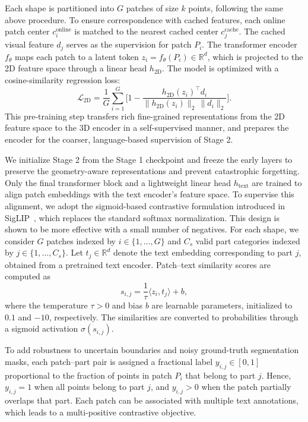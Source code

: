 Each shape is partitioned into \(G\) patches of size \(k\) points, following the same above procedure.
To ensure correspondence with cached features, each online patch center $c_i^{\text{online}}$ is matched
to the nearest cached center $c_j^{\text{cache}}$.
The cached visual feature $d_{j}$ serves as the supervision for patch $P_i$.
The transformer encoder $f_\theta$ maps each patch to a latent token
$z_i = f_\theta(P_i) \in \mathbb{R}^d$,
which is projected to the 2D feature space through a linear head $h_{\text{2D}}$.
The model is optimized with a cosine-similarity regression loss:
\begin{equation}
\mathcal{L}_{\text{2D}} =
\frac{1}{G} \sum_{i=1}^{G}
\Big[ 1 -
\frac{h_{\text{2D}}(z_i)^\top d_i}{
\|h_{\text{2D}}(z_i)\|_2 \, \|d_i\|_2}
\Big].
\end{equation}
This pre-training step transfers rich fine-grained representations from the 2D feature space to the 3D encoder in a self-supervised manner, and prepares the encoder for the coarser, language-based supervision of Stage 2.

We initialize Stage 2 from the Stage 1 checkpoint and freeze the early layers to preserve the geometry-aware representations and prevent catastrophic forgetting. Only the final transformer block and a lightweight linear head $h_{\text{text}}$ are trained to align patch embeddings with the text encoder's feature space.
To supervise this alignment, we adopt the sigmoid-based contrastive formulation introduced in SigLIP~\cite{zhai2023sigmoid}, which replaces the standard softmax normalization. This design is shown to be more effective with a small number of negatives.
For each shape, we consider $G$ patches indexed by $i \in \{1,\ldots,G\}$ and $C_s$ valid part categories indexed by $j \in \{1,\ldots,C_s\}$. Let $t_j \in \mathbb{R}^d$ denote the text embedding corresponding to part $j$, obtained from a pretrained text encoder. Patch–text similarity scores are computed as
\begin{equation}
    s_{i,j} = \frac{1}{\tau} \langle z_i, t_j \rangle + b,
\end{equation}
where the temperature $\tau > 0$ and bias $b$ are learnable parameters, initialized to $0.1$ and $-10$, respectively. The similarities are converted to probabilities through a sigmoid activation $\sigma(s_{i,j})$.

To add robustness to uncertain boundaries and noisy ground-truth segmentation masks, each patch–part pair is assigned a fractional label $y_{i,j} \in [0,1]$ proportional to the fraction of points in patch $P_i$ that belong to part $j$. Hence, $y_{i,j} = 1$ when all points belong to part $j$, and $y_{i,j} > 0$ when the patch partially overlaps that part. Each patch can be associated with multiple text annotations, which leads to a multi-positive contrastive objective.

